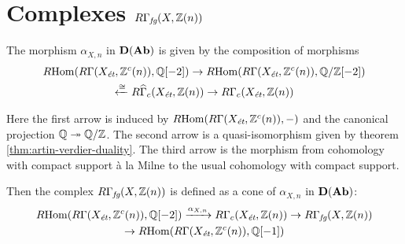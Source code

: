 
\section{Complexes
  \texorpdfstring{$R\Gamma_\text{\it fg} (X, \mathbb{Z} (n))$}{RΓ\_fg (X,Z(n))}}
\label{section:RGammafg}

\begin{definition}
  \label{definition:RGammaW}
  The morphism $\alpha_{X,n}$ in $\text{\bf D} (\text{\bf Ab})$ is given by the
  composition of morphisms
  \begin{multline*}
    R\!\operatorname{Hom} (R\Gamma (X_\text{\it ét}, \mathbb{Z}^c (n)), \mathbb{Q} [-2]) \to
    R\!\operatorname{Hom} (R\Gamma (X_\text{\it ét}, \mathbb{Z}^c (n)), \mathbb{Q}/\mathbb{Z}[-2]) \\
    \xleftarrow{\cong} R\widehat{\Gamma}_c (X_\text{\it ét}, \mathbb{Z} (n)) \to
    R\Gamma_c (X_\text{\it ét}, \mathbb{Z} (n))
  \end{multline*}

  Here the first arrow is induced by
  $R\!\operatorname{Hom} (R\Gamma (X_\text{\it ét}, \mathbb{Z}^c (n)), -)$ and the canonical projection
  $\mathbb{Q} \twoheadrightarrow \mathbb{Q}/\mathbb{Z}$. The second arrow is a quasi-isomorphism given by theorem
  \ref{thm:artin-verdier-duality}. The third arrow is the morphism
   from cohomology with compact
  support à la Milne to the usual cohomology with compact support.

  Then the complex $R\Gamma_\text{\it fg} (X, \mathbb{Z} (n))$ is defined as a cone of
  $\alpha_{X,n}$ in $\text{\bf D} (\text{\bf Ab})$:
  \begin{multline*}
    R\!\operatorname{Hom} (R\Gamma (X_\text{\it ét}, \mathbb{Z}^c (n)), \mathbb{Q} [-2])
    \xrightarrow{\alpha_{X,n}} R\Gamma_c (X_\text{\it ét}, \mathbb{Z} (n)) \to
    R\Gamma_\text{\it fg} (X, \mathbb{Z} (n)) \\
    \to R\!\operatorname{Hom} (R\Gamma (X_\text{\it ét}, \mathbb{Z}^c (n)), \mathbb{Q} [-1])
  \end{multline*}
\end{definition}

